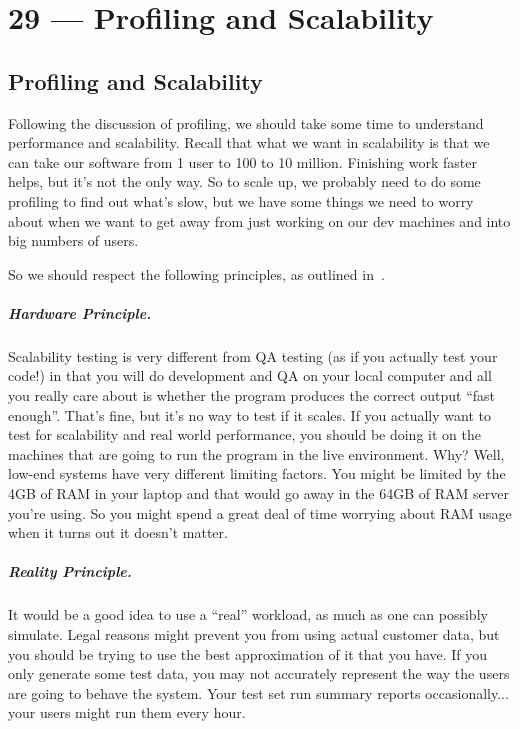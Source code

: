 \documentclass[a4paper]{report}
\begin{document}
\chapter*{29 --- Profiling and Scalability}


\section*{Profiling and Scalability}

Following the discussion of profiling, we should take some time to understand performance and scalability. Recall that what we want in scalability is that we can take our software from 1 user to 100 to 10 million. Finishing work faster helps, but it's not the only way. So to scale up, we probably need to do some profiling to find out what's slow, but we have some things we need to worry about when we want to get away from just working on our dev machines and into big numbers of users.

So we should respect the following principles, as outlined in~\cite{swps}.

\paragraph{Hardware Principle.} 
Scalability testing is very different from  QA testing (as if you actually test your code!) in that you will do development and QA on your local computer and all you really care about is whether the program produces the correct output ``fast enough''. That's fine, but it's no way to test if it scales. If you actually want to test for scalability and real world performance, you should be doing it on the machines that are going to run the program in the live environment. Why? Well, low-end systems have very different limiting factors. You might be limited by the 4GB of RAM in your laptop and that would go away in the 64GB of RAM server you're using. So you might spend a great deal of time worrying about RAM usage when it turns out it doesn't matter.

\paragraph{Reality Principle.}
It would be a good idea to use a ``real'' workload, as much as one can possibly simulate. Legal reasons might prevent you from using actual customer data, but you should be trying to use the best approximation of it that you have. If you only generate some test data, you may not accurately represent the way the users are going to behave the system. Your test set run summary reports occasionally... your users might run them every hour. 
\end{document}
